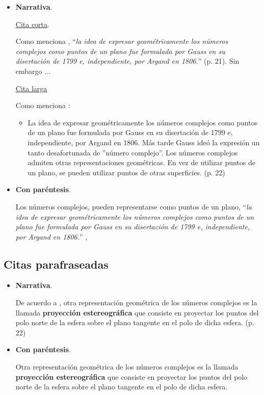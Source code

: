\begin{itemize}
  \item \textbf{Narrativa}.

  \underline{Cita corta}.

   Como menciona \cite{apostol1976analisis}, ``\emph{la idea de expresar geométricamente los números complejos como puntos de un plano fue formulada por Gauss en su disertación de 1799 e, independiente, por Argand en 1806.}'' (p. 21). Sin embargo ...

  \underline{Cita larga}

  Como menciona \cite{apostol1976analisis}:
  \begin{itemize}
    \item [] La idea de expresar geométricamente los números complejos como puntos de un plano fue formulada por Gauss en su disertación de 1799 e, independiente, por Argand en 1806. Más tarde Gauss ideó la expresión un tanto desafortunada de ''número complejo''. Los números complejos admiten otras representaciones geométricas. En vez de utilizar puntos de un plano, se pueden utilizar puntos de otras superficies. (p. 22)
  \end{itemize}



  \item \textbf{Con paréntesis}.

  Los números complejos, pueden representarse como puntos de un plano, ``\emph{la idea de expresar geométricamente los números complejos como puntos de un plano fue formulada por Gauss en su disertación de 1799 e, independiente, por Argand en 1806.}'' \cite[p. 21]{apostol1976analisis},

\end{itemize}

\subsection{Citas parafraseadas}
\begin{itemize}
  \item \textbf{Narrativa}.

  De acuerdo a \cite{apostol1976analisis}, otra representación geométrica de los números complejos es la llamada \textbf{proyección estereográfica} que consiste en proyectar los puntos del polo norte de la esfera sobre el plano tangente en el polo de dicha esfera. (p. 22)
  \item \textbf{Con paréntesis}.

  Otra representación geométrica de los números complejos es la llamada \textbf{proyección estereográfica} que consiste en proyectar los puntos del polo norte de la esfera sobre el plano tangente en el polo de dicha esfera.\cite[p. 22]{apostol1976analisis}
\end{itemize}



